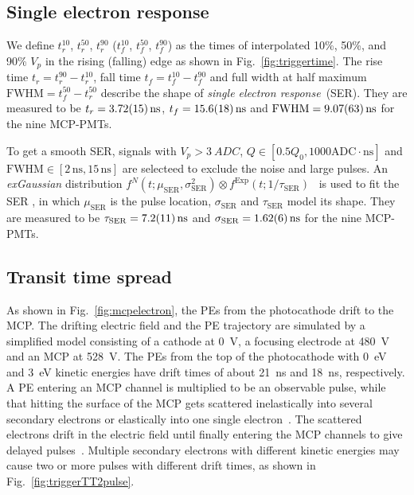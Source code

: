 \subsection{Single electron response}
\label{sec:SER}
We define $t^{10}_r$, $t^{50}_r$, $t^{90}_r$ ($t^{10}_f$, $t^{50}_f$, $t^{90}_f$) as the times of interpolated 10\%, 50\%, and 90\% $V_p$ in the rising (falling) edge as shown in Fig.~\ref{fig:triggertime}.  The rise time $t_r = t^{90}_r - t^{10}_r$, fall time $t_f = t^{10}_f - t^{90}_f$ and full width at half maximum $\mathrm{FWHM} = t^{50}_f - t^{50}_r$ describe the shape of \emph{single electron response}~(SER).  They are measured to be $t_r = \SI{3.72\pm0.15}{ns}$, $t_f = \SI{15.6\pm1.8}{ns}$ and $\mathrm{FWHM} = \SI{9.07\pm0.63}{ns}$ for the nine MCP-PMTs.

To get a smooth SER, signals with $V_p>\SI{3}{ADC}$, $Q \in [0.5Q_0, 1000\mathrm{ADC\cdot ns}]$ and $\mathrm{FWHM} \in [2\,\mathrm{ns}, 15\,\mathrm{ns}]$ are selecteed to exclude the noise and large pulses. %
An \emph{exGaussian} distribution $f^N(t;\mu_{\mathrm{SER}},\sigma_\mathrm{SER}^2)\otimes f^{\mathrm{Exp}}(t;1/\tau_\mathrm{SER})$~\cite{Luo:2022xrd} is used to fit the SER%
, in which $\mu_{\mathrm{SER}}$ is the pulse location, $\sigma_{\mathrm{SER}}$ and $\tau_{\mathrm{SER}}$ model its shape. They are measured to be $\tau_{\mathrm{SER}} = \SI{7.2\pm1.1}{ns}$ and $\sigma_{\mathrm{SER}} = \SI{1.62\pm0.06}{ns}$ for the nine MCP-PMTs.

\subsection{Transit time spread}
\label{sec:TTS}
As shown in Fig.~\ref{fig:mcpelectron}, the PEs from the photocathode drift to the MCP. The drifting electric field and the PE trajectory are simulated by a simplified model consisting of a cathode at \SI{0}{V}, a focusing electrode at \SI{480}{V} and an MCP at \SI{528}{V}. The PEs from the top of the photocathode with \SI{0}{eV} and \SI{3}{eV} kinetic energies have drift times of about \SI{21}{ns} and \SI{18}{ns}, respectively. A PE entering an MCP channel is multiplied to be an observable pulse, while that hitting the surface of the MCP gets scattered inelastically into several secondary electrons or elastically into one single electron~\cite{Furman}. The scattered electrons drift in the electric field until finally entering the MCP channels to give delayed pulses~\cite{KM3NetTesting}. Multiple secondary electrons with different kinetic energies may cause two or more pulses with different drift times, as shown in Fig.~\ref{fig:triggerTT2pulse}.

